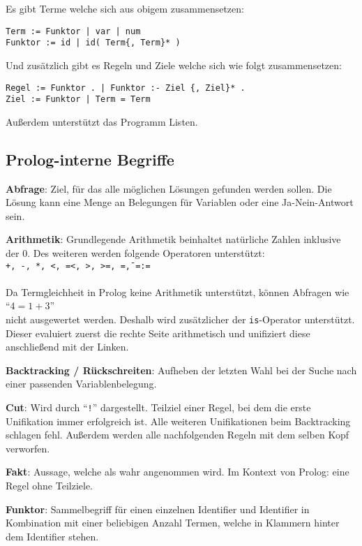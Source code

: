 \documentclass[parskip=full,11pt,twoside]{scrartcl}
\begin{document}
Es gibt Terme welche sich aus obigem zusammensetzen:

\begin{lstlisting}
Term := Funktor | var | num
Funktor := id | id( Term{, Term}* )
\end{lstlisting}

Und zusätzlich gibt es Regeln und Ziele welche sich wie folgt zusammensetzen:

\begin{lstlisting}
Regel := Funktor . | Funktor :- Ziel {, Ziel}* .
Ziel := Funktor | Term = Term
\end{lstlisting}

Außerdem unterstützt das Programm Listen.

\subsection{Prolog-interne Begriffe}
\textbf{Abfrage}:
Ziel, für das alle möglichen Lösungen gefunden werden sollen. Die Lösung kann eine Menge an Belegungen für Variablen oder eine Ja-Nein-Antwort sein.

\textbf{Arithmetik}:
Grundlegende Arithmetik beinhaltet natürliche Zahlen inklusive der 0. Des weiteren werden folgende Operatoren unterstützt:\\
\texttt{+, -, *, <, =<, >, >=, =\=, =:=}\\
\\
Da Termgleichheit in Prolog keine Arithmetik unterstützt, können Abfragen wie\\
\enquote{$4 = 1 + 3$}\\
nicht ausgewertet werden. Deshalb wird zusätzlicher der \texttt{is}-Operator unterstützt. Dieser evaluiert zuerst die rechte Seite arithmetisch und unifiziert diese anschließend mit der Linken.

\textbf{Backtracking / Rückschreiten}:
Aufheben der letzten Wahl bei der Suche nach einer passenden Variablenbelegung.

\textbf{Cut}:
Wird durch \enquote{\texttt{!}} dargestellt. Teilziel einer Regel, bei dem die erste Unifikation immer erfolgreich ist. Alle weiteren Unifikationen beim Backtracking schlagen fehl. Außerdem werden alle nachfolgenden Regeln mit dem selben Kopf verworfen.

\textbf{Fakt}:
Aussage, welche als wahr angenommen wird. Im Kontext von Prolog: eine Regel ohne Teilziele.

\textbf{Funktor}:
Sammelbegriff für einen einzelnen Identifier und Identifier in Kombination mit einer beliebigen Anzahl Termen, welche in Klammern hinter dem Identifier stehen.
\end{document}
